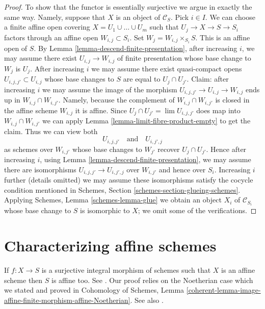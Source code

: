\documentclass{stacks-project}
\theoremstyle{plain}
\theoremstyle{definition}
\theoremstyle{remark}
\numberwithin{equation}{subsection}
\def\lim{\mathop{\mathrm{lim}}\nolimits}
\begin{document}
\begin{proof}
\medskip\noindent
To show that the functor is essentially surjective we argue in
exactly the same way. Namely, suppose that
$X$ is an object of $\mathcal{C}_S$. Pick $i \in I$.
We can choose a finite affine open covering
$X = U_1 \cup \ldots \cup U_m$ such that $U_j \to X \to S \to S_i$
factors through an affine open $W_{i, j} \subset S_i$.
Set $W_j = W_{i, j} \times_{S_i} S$. This is an affine open of $S$.
By Lemma \ref{lemma-descend-finite-presentation},
after increasing $i$, we may assume there exist
$U_{i, j} \to W_{i, j}$ of finite presentation
whose base change to $W_j$ is $U_j$.
After increasing $i$ we may assume there exist
quasi-compact opens $U_{i, j, j'} \subset U_{i, j}$
whose base changes to $S$ are equal to $U_j \cap U_{j'}$.
Claim: after increasing $i$ we may assume the image of the morphism
$U_{i, j, j'} \to U_{i, j} \to W_{i, j}$
ends up in $W_{i, j} \cap W_{i, j'}$.
Namely, because the complement of $W_{i, j} \cap W_{i, j'}$
is closed in the affine scheme $W_{i, j}$ it is affine.
Since $U_j \cap U_{j'} = \lim U_{i, j, j'}$ does map into
$W_{i, j} \cap W_{i, j'}$
we can apply Lemma \ref{lemma-limit-fibre-product-empty}
to get the claim. Thus we can view both
$$
U_{i, j, j'} \quad\text{and}\quad U_{i, j', j}
$$
as schemes over $W_{i, j'}$ whose base changes to $W_{j'}$
recover $U_j \cap U_{j'}$. Hence after increasing $i$, using
Lemma \ref{lemma-descend-finite-presentation},
we may assume there are isomorphisms
$U_{i, j, j'} \to U_{i, j', j}$ over $W_{i, j'}$ and hence
over $S_i$. Increasing $i$ further (details omitted)
we may assume these isomorphisms
satisfy the cocycle condition mentioned in
Schemes, Section \ref{schemes-section-glueing-schemes}.
Applying Schemes, Lemma \ref{schemes-lemma-glue}
we obtain an object $X_i$ of $\mathcal{C}_{S_i}$ whose
base change to $S$ is isomorphic to $X$; we omit some
of the verifications.
\end{proof}












\section{Characterizing affine schemes}
\label{section-affine}

\noindent
If $f : X \to S$ is a surjective integral morphism of schemes
such that $X$ is an affine scheme then $S$ is affine too.
See \cite[A.2]{Conrad-Nagata}. Our proof relies
on the Noetherian case which we stated and proved in Cohomology of Schemes,
Lemma \ref{coherent-lemma-image-affine-finite-morphism-affine-Noetherian}.
See also \cite[II 6.7.1]{EGA}.
\end{document}
